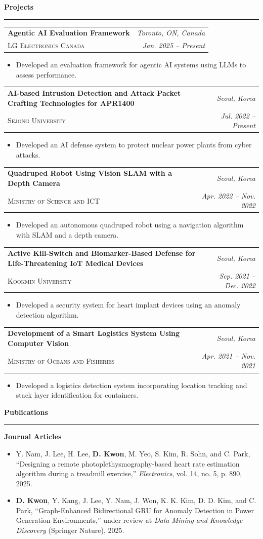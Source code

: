 \documentclass[11pt,letterpaper]{article}
\makeatletter
\newcommand{\awesomesection}[2]{%
  \vspace{0.5em}\par\noindent
  {\fontsize{16pt}{18pt}\bfseries\color{awesomered}#1\color{ink}#2}%
  \par\vspace{-0.5em}%
  {\color{ink}\rule{\linewidth}{0.5pt}}\par
  \vspace{0.3em}%
}
\newcommand{\entry}[4]{%
  \begin{tabularx}{\linewidth}{@{}X r@{}}
    {\fontsize{10.5pt}{12pt}\bfseries #1} & {\fontsize{9.5pt}{11pt}\itshape\color{awesomesoft} #2} \\[0.05em]
    {\fontsize{8.8pt}{10pt}\scshape #3} & {\fontsize{9.5pt}{11pt}\itshape\color{awesomesoft} #4} \\
  \end{tabularx}\par\vspace{0.15em}
}
\makeatother
\begin{document}
\awesomesection{Pro}{jects}

\entry{Agentic AI Evaluation Framework}{Toronto, ON, Canada}{LG Electronics Canada}{Jan. 2025 -- Present}
\begin{itemize}
  \item Developed an evaluation framework for agentic AI systems using LLMs to assess performance.
\end{itemize}

\entry{AI-based Intrusion Detection and Attack Packet Crafting Technologies for APR1400}{Seoul, Korea}{Sejong University}{Jul. 2022 -- Present}
\begin{itemize}
  \item Developed an AI defense system to protect nuclear power plants from cyber attacks.
\end{itemize}

\entry{Quadruped Robot Using Vision SLAM with a Depth Camera}{Seoul, Korea}{Ministry of Science and ICT}{Apr. 2022 -- Nov. 2022}
\begin{itemize}
  \item Developed an autonomous quadruped robot using a navigation algorithm with SLAM and a depth camera.
\end{itemize}

\entry{Active Kill-Switch and Biomarker-Based Defense for Life-Threatening IoT Medical Devices}{Seoul, Korea}{Kookmin University}{Sep. 2021 -- Dec. 2022}
\begin{itemize}
  \item Developed a security system for heart implant devices using an anomaly detection algorithm.
\end{itemize}

\entry{Development of a Smart Logistics System Using Computer Vision}{Seoul, Korea}{Ministry of Oceans and Fisheries}{Apr. 2021 -- Nov. 2021}
\begin{itemize}
  \item Developed a logistics detection system incorporating location tracking and stack layer identification for containers.
\end{itemize}

\awesomesection{Pub}{lications}

\textbf{Journal Articles}
\begin{itemize}
  \item Y. Nam, J. Lee, H. Lee, \textbf{D. Kwon}, M. Yeo, S. Kim, R. Sohn, and C. Park, ``Designing a remote photoplethysmography-based heart rate estimation algorithm during a treadmill exercise,'' \textit{Electronics}, vol. 14, no. 5, p. 890, 2025.
  \item \textbf{D. Kwon}, Y. Kang, J. Lee, Y. Nam, J. Won, K. K. Kim, D. D. Kim, and C. Park, ``Graph-Enhanced Bidirectional GRU for Anomaly Detection in Power Generation Environments,'' under review at \textit{Data Mining and Knowledge Discovery} (Springer Nature), 2025.
\end{itemize}
\end{document}
